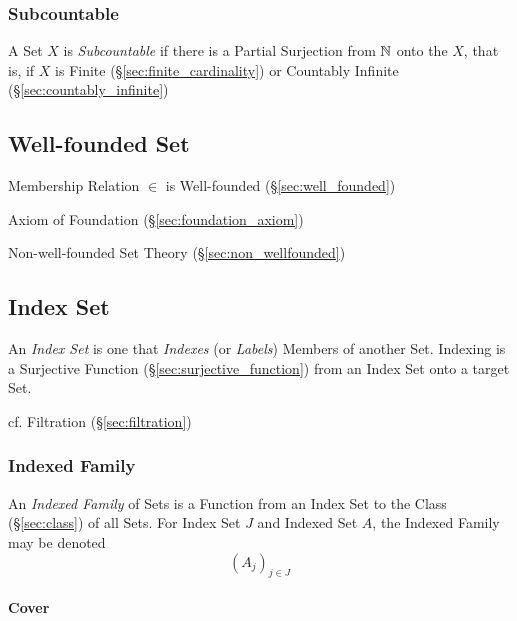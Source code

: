 \subsubsection{Subcountable}\label{sec:subcountable}

A Set $X$ is \emph{Subcountable} if there is a Partial Surjection from
$\mathbb{N}$ onto the $X$, that is, if $X$ is Finite
(\S\ref{sec:finite_cardinality}) or Countably Infinite
(\S\ref{sec:countably_infinite})



\subsection{Well-founded Set}\label{sec:wellfounded_set}

Membership Relation $\in$ is Well-founded (\S\ref{sec:well_founded})

Axiom of Foundation (\S\ref{sec:foundation_axiom})

Non-well-founded Set Theory (\S\ref{sec:non_wellfounded})



\subsection{Index Set}\label{sec:index_set}

An \emph{Index Set} is one that \emph{Indexes} (or \emph{Labels})
Members of another Set. Indexing is a Surjective Function
(\S\ref{sec:surjective_function}) from an Index Set onto a target Set.

\fist cf. Filtration (\S\ref{sec:filtration})



\subsubsection{Indexed Family}\label{sec:indexed_family}

An \emph{Indexed Family} of Sets is a Function from an Index Set to
the Class (\S\ref{sec:class}) of all Sets. For Index Set $J$ and
Indexed Set $A$, the Indexed Family may be denoted
\[
  (A_j)_{j \in J}
\]



\paragraph{Cover}\label{sec:cover}\hfill


